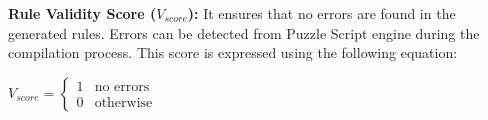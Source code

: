 \textbf{Rule Validity Score ($V_{score}$):} It ensures that no errors are found in the generated rules. Errors can be detected from Puzzle Script engine during the compilation process. This score is expressed using the following equation:
\begin{center}
$V_{score}= \begin{cases}
               1 & \text{no errors}\\
               0 & \text{otherwise}
           \end{cases}$
\end{center}
